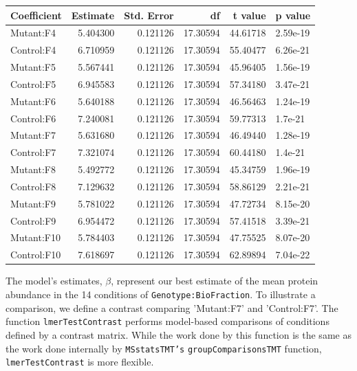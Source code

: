 \documentclass[11pt]{elife}\usepackage[]{graphicx}\usepackage[]{color}
\newenvironment{knitrout}{}{} %
\begin{document}
\begin{knitrout}
\color{fgcolor}
\begin{tabular}{l|r|r|r|r|l}
\hline
Coefficient & Estimate & Std. Error & df & t value & p value\\
\hline
Mutant:F4 & 5.404300 & 0.121126 & 17.30594 & 44.61718 & 2.59e-19\\
\hline
Control:F4 & 6.710959 & 0.121126 & 17.30594 & 55.40477 & 6.26e-21\\
\hline
Mutant:F5 & 5.567441 & 0.121126 & 17.30594 & 45.96405 & 1.56e-19\\
\hline
Control:F5 & 6.945583 & 0.121126 & 17.30594 & 57.34180 & 3.47e-21\\
\hline
Mutant:F6 & 5.640188 & 0.121126 & 17.30594 & 46.56463 & 1.24e-19\\
\hline
Control:F6 & 7.240081 & 0.121126 & 17.30594 & 59.77313 & 1.7e-21\\
\hline
Mutant:F7 & 5.631680 & 0.121126 & 17.30594 & 46.49440 & 1.28e-19\\
\hline
Control:F7 & 7.321074 & 0.121126 & 17.30594 & 60.44180 & 1.4e-21\\
\hline
Mutant:F8 & 5.492772 & 0.121126 & 17.30594 & 45.34759 & 1.96e-19\\
\hline
Control:F8 & 7.129632 & 0.121126 & 17.30594 & 58.86129 & 2.21e-21\\
\hline
Mutant:F9 & 5.781022 & 0.121126 & 17.30594 & 47.72734 & 8.15e-20\\
\hline
Control:F9 & 6.954472 & 0.121126 & 17.30594 & 57.41518 & 3.39e-21\\
\hline
Mutant:F10 & 5.784403 & 0.121126 & 17.30594 & 47.75525 & 8.07e-20\\
\hline
Control:F10 & 7.618697 & 0.121126 & 17.30594 & 62.89894 & 7.04e-22\\
\hline
\end{tabular}


\end{knitrout}

The model's estimates, $\beta$, represent our best estimate of the mean protein
abundance in the 14 conditions of \texttt{Genotype:BioFraction}. To illustrate a
comparison, we define a contrast comparing 'Mutant:F7' and 'Control:F7'.
The function  \texttt{lmerTestContrast} performs model-based comparisons of
conditions defined by a contrast matrix. While the work done by this function 
is the same as the work done internally by \texttt{MSstatsTMT's}
\texttt{groupComparisonsTMT} function, \texttt{lmerTestContrast} is more
flexible.\\
\end{document}
